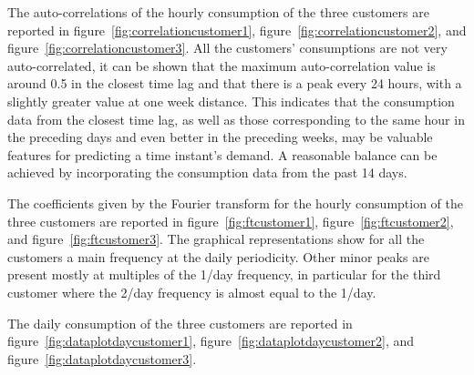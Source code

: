 The auto-correlations of the hourly consumption of the three customers are reported in figure~\ref{fig:correlationcustomer1}, figure~\ref{fig:correlationcustomer2}, and figure~\ref{fig:correlationcustomer3}.
All the customers’ consumptions are not very auto-correlated, it can be shown that the maximum auto-correlation value is around 0.5 in the closest time lag and that there is a peak every 24 hours, with a slightly greater value at one week distance.
This indicates that the consumption data from the closest time lag, as well as those corresponding to the same hour in the preceding days and even better in the preceding weeks, may be valuable features for predicting a time instant's demand.
A reasonable balance can be achieved by incorporating the consumption data from the past 14 days.

The coefficients given by the Fourier transform for the hourly consumption of the three customers are reported in figure~\ref{fig:ftcustomer1}, figure~\ref{fig:ftcustomer2}, and figure~\ref{fig:ftcustomer3}.
The graphical representations show for all the customers a main frequency at the daily periodicity.
Other minor peaks are present mostly at multiples of the 1/day frequency, in particular for the third customer where the 2/day frequency is almost equal to the 1/day.

The daily consumption of the three customers are reported in figure~\ref{fig:dataplotdaycustomer1}, figure~\ref{fig:dataplotdaycustomer2}, and figure~\ref{fig:dataplotdaycustomer3}.

